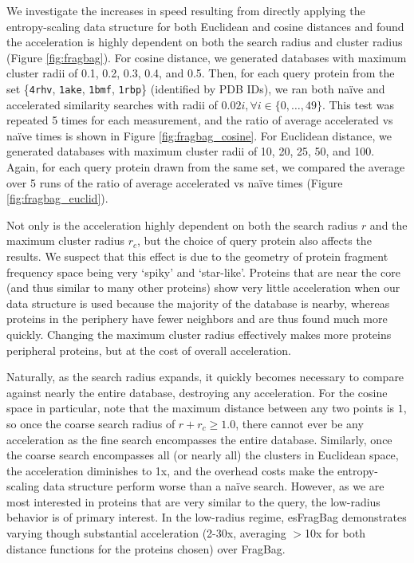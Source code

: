 \documentclass[review,preprint,12pt]{elsarticle}
\theoremstyle{definition}
\theoremstyle{remark}
\numberwithin{equation}{section}
\begin{document}
We investigate the increases in speed resulting from directly applying the entropy-scaling data structure for both Euclidean and cosine distances and found the acceleration is highly dependent on both the search radius and cluster radius (Figure \ref{fig:fragbag}).
For cosine distance, we generated databases with maximum cluster radii of 0.1, 0.2, 0.3, 0.4, and 0.5.
Then, for each query protein from the set \{\texttt{4rhv}, \texttt{1ake}, \texttt{1bmf}, \texttt{1rbp}\} (identified by PDB IDs), we ran both na\"ive and accelerated similarity searches with radii of $0.02i, \forall i \in \{0,\ldots,49\}$.
This test was repeated 5 times for each measurement, and the ratio of average accelerated vs na\"ive times is shown in Figure \ref{fig:fragbag_cosine}.
For Euclidean distance, we generated databases with maximum cluster radii of 10, 20, 25, 50, and 100.
Again, for each query protein drawn from the same set, we compared the average over 5 runs of the ratio of average accelerated vs na\"ive times (Figure \ref{fig:fragbag_euclid}).

Not only is the acceleration highly dependent on both the search radius $r$ and the maximum cluster radius $r_c$,
but the choice of query protein also affects the results.
We suspect that this effect is due to the geometry of protein fragment frequency space being very `spiky' and `star-like'.
Proteins that are near the core (and thus similar to many other proteins) show very little acceleration when our data structure is used because the majority of the database is nearby, whereas proteins in the periphery have fewer neighbors and are thus found much more quickly.
Changing the maximum cluster radius effectively makes more proteins peripheral proteins, but at the cost of overall acceleration.

Naturally, as the search radius expands, it quickly becomes necessary to compare against nearly the entire database, destroying any acceleration.
For the cosine space in particular, note that the maximum distance between any two points is $1$, so once the coarse search radius of $r+r_c \ge 1.0$, there cannot ever be any acceleration as the fine search encompasses the entire database.
Similarly, once the coarse search encompasses all (or nearly all) the clusters in Euclidean space, the acceleration diminishes to 1x, and the overhead costs make the entropy-scaling data structure perform worse than a na\"ive search.
However, as we are most interested in proteins that are very similar to the query, the low-radius behavior is of primary interest.
In the low-radius regime, esFragBag demonstrates varying though substantial acceleration (2-30x, averaging $>$10x for both distance functions for the proteins chosen) over FragBag.
\end{document}
